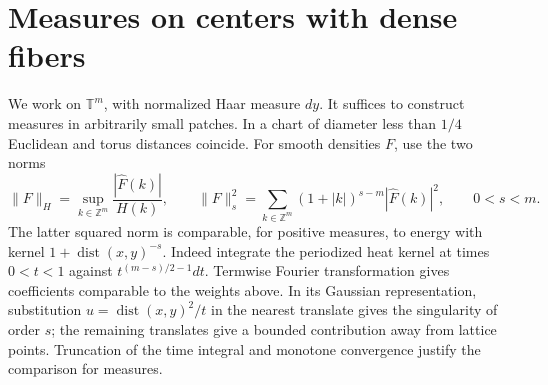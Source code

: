 \documentclass[11pt,a4paper,reqno]{amsart}
\theoremstyle{definition}
\theoremstyle{remark}
\numberwithin{equation}{section}
\begin{document}
\section{Measures on centers with dense fibers}\label{sec:construction}
We work on \(\mathbb T^m\), with normalized Haar measure \(dy\). It
suffices to construct measures in arbitrarily small patches. In a chart
of diameter less than \(1/4\) Euclidean and torus distances coincide.
For smooth densities \(F\), use the two norms
\[
 \|F\|_H=\sup_{k\in\mathbb Z^m}\frac{|\widehat F(k)|}{H(k)},\qquad
 \|F\|_s^2=\sum_{k\in\mathbb Z^m}(1+|k|)^{s-m}|\widehat F(k)|^2,
 \qquad 0<s<m.
\]
The latter squared norm is comparable, for positive measures, to energy
with kernel \(1+\operatorname{dist}(x,y)^{-s}\). Indeed integrate the
periodized heat kernel at times \(0<t<1\) against \(t^{(m-s)/2-1}dt\).
Termwise Fourier transformation gives coefficients comparable to the
weights above. In its Gaussian representation, substitution
\(u=\operatorname{dist}(x,y)^2/t\) in the nearest translate gives the
singularity of order \(s\); the remaining translates give a bounded
contribution away from lattice points. Truncation of the time integral
and monotone convergence justify the comparison for measures.
\end{document}

